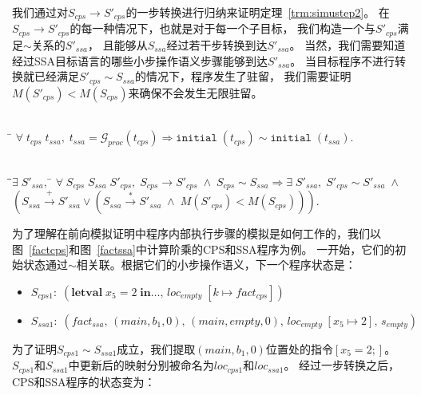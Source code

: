 我们通过对$S_{cps}\rightarrow S'_{cps}$的一步转换进行归纳来证明定理~\ref{trm:simustep2}。
在$S_{cps}\rightarrow S'_{cps}$的每一种情况下，也就是对于每一个子目标，
我们构造一个与$S'_{cps}$满足$\sim$关系的$S'_{ssa}$，
且能够从$S_{ssa}$经过若干步转换到达$S'_{ssa}$。
当然，我们需要知道经过SSA目标语言的哪些小步操作语义步骤能够到达$S'_{ssa}$。
当目标程序不进行转换就已经满足$S'_{cps}\sim S_{ssa}$的情况下，程序发生了驻留，
我们需要证明$M(S'_{cps})<M(S_{cps})$来确保不会发生无限驻留。

\begin{theorem}[CPS到SSA转换中初始状态的模拟]\label{def:fsimssa}
    \begin{tabbing}
      \\
        \quad\=\kill 
        \>$\forall\; t_{cps} \; t_{ssa},\;
        t_{ssa}=\mathcal{G}_{proc}(t_{cps})\Longrightarrow \mathtt{initial}\; (t_{cps})
        \sim \mathtt{initial}\; (t_{ssa}).$
    \end{tabbing}
  \end{theorem}

  \begin{theorem}[CPS到SSA转换中程序内部执行步骤的模拟]\label{trm:simustep2}
    \begin{tabbing}
      \\
    \quad\=\qquad\=$\exists\; S'_{ssa},\; $\=\kill
    \>$\forall \; S_{cps}\; S_{ssa}\; S'_{cps},\; S_{cps}\rightarrow S'_{cps}\; \wedge \; S_{cps}\sim S_{ssa} \Longrightarrow \exists\; S'_{ssa},\; S'_{cps}\sim S'_{ssa}\; \wedge$\\
    \>\>$(S_{ssa}\xrightarrow{+} S'_{ssa} \lor  (S_{ssa}\xrightarrow{*} S'_{ssa}\; \wedge \;  M(S'_{cps})<M(S_{cps})))$.
    \end{tabbing}
  \end{theorem}

为了理解在前向模拟证明中程序内部执行步骤的模拟是如何工作的，我们以图~\ref{factcps}和图~\ref{factssa}中计算阶乘的CPS和SSA程序为例。
一开始，它们的初始状态通过$\sim$相关联。根据它们的小步操作语义，下一个程序状态是：

\begin{itemize}
    \item $S_{cps1}:\; (\mathbf{letval}\; x_5=2\; \mathbf{in}\dots,\, loc_{empty}\; [k\mapsto fact_{cps}])$
    \item $S_{ssa1}:\; (fact_{ssa},\, (main, b_1, 0),\, (main, empty, 0),\, loc_{empty}\; [x_5\mapsto 2],\, s_{empty})$
\end{itemize}

为了证明$S_{cps1}\sim S_{ssa1}$成立，我们提取$(main, b_1, 0)$位置处的指令$[x_5 = 2;]$。
$S_{cps1}$和$S_{ssa1}$中更新后的映射分别被命名为$loc_{cps1}$和$loc_{ssa1}$。
经过一步转换之后，CPS和SSA程序的状态变为：

